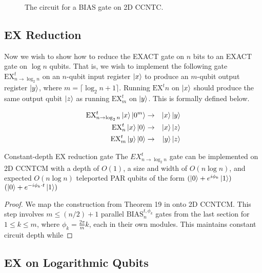 \begin{figure}
\caption{The circuit for a BIAS gate on 2D CCNTC.}
\label{fig:mu-circuit}
\end{figure}

\subsection{EX Reduction}
\label{subsec:ex-reduce}

Now we wish to show how to reduce the EXACT gate on $n$ bits to an EXACT
gate on $\log n$ qubits. That is, we wish to implement the following gate
$\text{EX}^t_{n\rightarrow \log_2 n}$ on an $n$-qubit input register $\left\vert{x}\right\rangle$
to produce an $m$-qubit output register $\left\vert{y}\right\rangle$, where
$m = \lceil \log_2 n + 1 \rceil$. Running $\text{EX}^t{n}$
on $\left\vert{x}\right\rangle$ should produce the same output qubit $\left\vert{z}\right\rangle$ as running
$\text{EX}^t_{m}$ on $\left\vert{y}\right\rangle$. This is formally defined below.

\begin{eqnarray}
\text{EX}^t_{n\rightarrow \log_2 n} \left\vert{x}\right\rangle\left\vert{0^m}\right\rangle & \rightarrow &\left\vert{x}\right\rangle\left\vert{y}\right\rangle \\
\text{EX}^t_n \left\vert{x}\right\rangle\left\vert{0}\right\rangle & \rightarrow & \left\vert{x}\right\rangle\left\vert{z}\right\rangle \\
\text{EX}^t_m \left\vert{y}\right\rangle\left\vert{0}\right\rangle & \rightarrow & \left\vert{y}\right\rangle\left\vert{z}\right\rangle
\end{eqnarray}

\begin{theorem}{Constant-depth EX reduction gate}
The $EX^t_{n\rightarrow \log_2 n}$ gate can be implemented on 2D CCNTCM with
a depth of $O(1)$, a size and width of $O(n\log n)$, and expected
$O(n\log n)$ teleported PAR qubits of the form $(\left\vert{0}\right\rangle + e^{i\phi_k}\left\vert{1}\right\rangle)$
$(\left\vert{0}\right\rangle + e^{-i\phi_k\cdot t}\left\vert{1}\right\rangle)$
\label{thm:ex-reduce}
\end{theorem}

\begin{proof}
We map the construction from Theorem 19 in \cite{Hoyer2002} onto
2D CCNTCM.
This step involves $m \le (n/2)+1$ parallel $\text{BIAS}^{t,\phi_k}_n$ gates from the last section for
$1 \le k \le m$, where $\phi_k = \frac{2\pi}{m}k$, each in their own modules.
This maintains constant circuit depth while 
\end{proof}

\subsection{EX on Logarithmic Qubits}
\label{subsec:or-exact}

